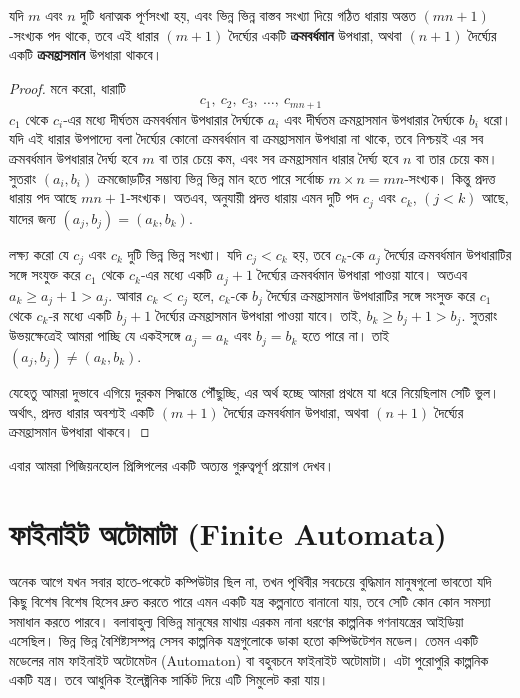 \begin{theorem}[এরডশ-সেকেরেশ, ১৯৩৫]
	যদি $m$ এবং $n$ দুটি ধনাত্মক পূর্ণসংখা হয়, এবং ভিন্ন ভিন্ন বাস্তব সংখ্যা দিয়ে গঠিত ধারায় অন্তত $(mn+1)$-সংখ্যক পদ থাকে, তবে এই ধারার $(m+1)$ দৈর্ঘ্যের একটি \textbf{ক্রমবর্ধমান} উপধারা, অথবা $(n+1)$ দৈর্ঘ্যের একটি \textbf{ক্রমহ্রাসমান} উপধারা থাকবে।
\end{theorem}
\begin{proof}
	মনে করো, ধারাটি \[c_1,\ c_2,\ c_3,\ \ldots,\ c_{mn+1}\]
	$c_1$ থেকে $c_i$-এর মধ্যে দীর্ঘতম ক্রমবর্ধমান উপধারার দৈর্ঘ্যকে $a_i$ এবং দীর্ঘতম ক্রমহ্রাসমান উপধারার দৈর্ঘ্যকে $b_i$ ধরো। যদি এই ধারার উপপাদ্যে বলা দৈর্ঘ্যের কোনো ক্রমবর্ধমান বা ক্রমহ্রাসমান উপধারা না থাকে, তবে নিশ্চয়ই এর সব ক্রমবর্ধমান উপধারার দৈর্ঘ্য হবে $m$ বা তার চেয়ে কম, এবং সব ক্রমহ্রাসমান ধারার দৈর্ঘ্য হবে $n$ বা তার চেয়ে কম। সুতরাং $(a_i,b_i)$ ক্রমজোড়টির সম্ভাব্য ভিন্ন ভিন্ন মান হতে পারে সর্বোচ্চ $m\times n=mn$-সংখ্যক। কিন্তু প্রদত্ত ধারায় পদ আছে $mn+1$-সংখ্যক। অতএব, \phpname{} অনুযায়ী প্রদত্ত ধারায় এমন দুটি পদ $c_j$ এবং $c_k$, $(j<k)$ আছে, যাদের জন্য $(a_j,b_j)= (a_k,b_k)$.

	লক্ষ্য করো যে $c_j$ এবং $c_k$ দুটি ভিন্ন ভিন্ন সংখ্যা। যদি $c_j < c_k$ হয়, তবে $c_k$-কে $a_j$ দৈর্ঘ্যের ক্রমবর্ধমান উপধারাটির সঙ্গে সংযুক্ত করে $c_1$ থেকে $c_k$-এর মধ্যে একটি $a_j+1$ দৈর্ঘ্যের ক্রমবর্ধমান উপধারা পাওয়া যাবে। অতএব $a_k\ge a_j+1>a_j$. আবার $c_k<c_j$ হলে, $c_k$-কে $b_j$ দৈর্ঘ্যের ক্রমহ্রাসমান উপধারাটির সঙ্গে সংসুক্ত করে $c_1$ থেকে $c_k$-র মধ্যে একটি $b_j+1$ দৈর্ঘ্যের ক্রমহ্রাসমান উপধারা পাওয়া যাবে। তাই, $b_k\ge b_j+1>b_j$. সুতরাং উভয়ক্ষেত্রেই আমরা পাচ্ছি যে একইসঙ্গে $a_j=a_k$ এবং $b_j=b_k$ হতে পারে না। তাই $(a_j,b_j)\neq (a_k,b_k)$.

	যেহেতু আমরা দুভাবে এগিয়ে দুরকম সিদ্ধান্তে পৌঁছুচ্ছি, এর অর্থ হচ্ছে আমরা প্রথমে যা ধরে নিয়েছিলাম সেটি ভুল। অর্থাৎ, প্রদত্ত ধারার অবশ্যই একটি $(m+1)$ দৈর্ঘ্যের ক্রমবর্ধমান উপধারা, অথবা $(n+1)$ দৈর্ঘ্যের ক্রমহ্রাসমান উপধারা থাকবে।
\end{proof}
এবার আমরা পিজিয়নহোল প্রিন্সিপলের একটি অত্যন্ত গুরুত্বপূর্ণ প্রয়োগ দেখব।

\section{ফাইনাইট অটোমাটা (Finite Automata)}
অনেক আগে যখন সবার হাতে-পকেটে কম্পিউটার ছিল না, তখন পৃথিবীর সবচেয়ে বুদ্ধিমান মানুষগুলো ভাবতো যদি কিছু বিশেষ বিশেষ হিসেব দ্রুত করতে পারে এমন একটি যন্ত্র কল্পনাতে বানানো যায়, তবে সেটি কোন কোন সমস্যা সমাধান করতে পারবে। বলাবাহুল্য বিভিন্ন মানুষের মাথায় এরকম নানা ধরণের কাল্পনিক গণনাযন্ত্রের আইডিয়া এসেছিল। ভিন্ন ভিন্ন বৈশিষ্ট্যসম্পন্ন সেসব কাল্পনিক যন্ত্রগুলোকে ডাকা হতো কম্পিউটেশন মডেল। তেমন একটি মডেলের নাম ফাইনাইট অটোমেটন (Automaton) বা বহুবচনে ফাইনাইট অটোমাটা। এটা পুরোপুরি কাল্পনিক একটি যন্ত্র। তবে আধুনিক ইলেক্ট্রনিক সার্কিট দিয়ে এটি সিমুলেট করা যায়। 

